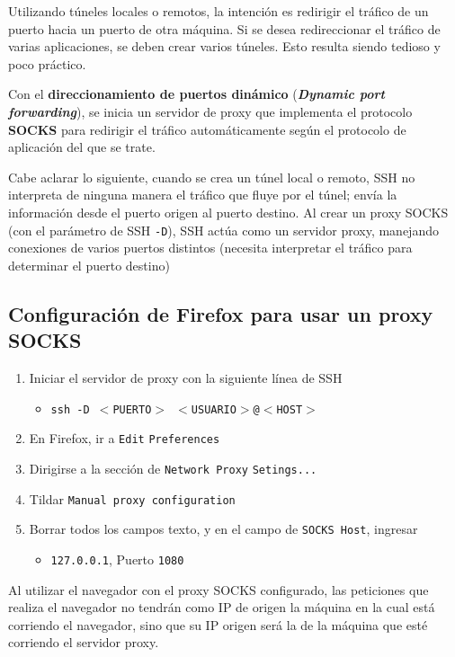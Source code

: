 Utilizando túneles locales o remotos, la intención es redirigir el tráfico de un puerto hacia un puerto de otra máquina. Si se desea redireccionar el tráfico de varias aplicaciones, se deben crear varios túneles. Esto resulta siendo tedioso y poco práctico.

Con el \textbf{direccionamiento de puertos dinámico} (\emph{\textbf{Dynamic port forwarding}}), se inicia un servidor de proxy que implementa el protocolo \textbf{SOCKS} para redirigir el tráfico automáticamente según el protocolo de aplicación del que se trate. 

Cabe aclarar lo siguiente, cuando se crea un túnel local o remoto, SSH no interpreta de ninguna manera el tráfico que fluye por el túnel; envía la información desde el puerto origen al puerto destino. Al crear un proxy SOCKS (con el parámetro de SSH \texttt{-D}), SSH actúa como un servidor proxy, manejando conexiones de varios puertos distintos (necesita interpretar el tráfico para determinar el puerto destino) \autocite{SODynamicPortForwarding}

\subsection{Configuración de Firefox para usar un proxy SOCKS}

\begin{enumerate}
    \item Iniciar el servidor de proxy con la siguiente línea de SSH
    \begin{itemize}
        \item \texttt{ssh -D $<$PUERTO$>$ $<$USUARIO$>$@$<$HOST$>$} 
    \end{itemize}
    \item En Firefox, ir a \texttt{Edit} \textrightarrow{} \texttt{Preferences}  
    \item Dirigirse a la sección de \texttt{Network Proxy} \textrightarrow{} \texttt{Setings...} 
    \item Tildar \texttt{Manual proxy configuration} 
    \item Borrar todos los campos texto, y en el campo de \texttt{SOCKS Host}, ingresar
    \begin{itemize}
        \item \texttt{127.0.0.1}, Puerto \texttt{1080}  
    \end{itemize}
\end{enumerate}

Al utilizar el navegador con el proxy SOCKS configurado, las peticiones que realiza el navegador no tendrán como IP de origen la máquina en la cual está corriendo el navegador, sino que su IP origen será la de la máquina que esté corriendo el servidor proxy.

